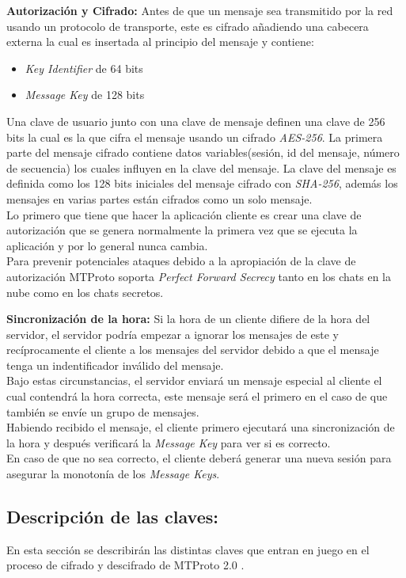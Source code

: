 \begin{description}
	\item \textbf{Autorización y Cifrado:}
			Antes de que un mensaje sea transmitido por la red usando un protocolo de transporte, este es cifrado añadiendo una cabecera externa la cual es insertada al principio del mensaje y contiene:
	\begin{itemize}
		\item \emph{Key Identifier} de 64 bits
		\item \emph{Message Key} de 128 bits
	\end{itemize}
Una clave de usuario junto con una clave de mensaje definen una clave de 256 bits la cual es la que cifra el mensaje usando un cifrado \emph{AES-256}.
La primera parte del mensaje cifrado contiene datos variables(sesión, id del mensaje, número de secuencia) los cuales influyen en la clave del mensaje. La clave del mensaje es definida como los 128 bits iniciales del mensaje cifrado con \emph{SHA-256}, 
además los mensajes en varias partes están cifrados como un solo mensaje.\\
Lo primero que tiene que hacer la aplicación cliente es crear una clave de autorización que se genera normalmente la primera vez que se ejecuta la aplicación y por lo general nunca cambia.\\
Para prevenir potenciales ataques debido a la apropiación de la clave de autorización MTProto soporta \emph{Perfect Forward Secrecy} tanto en los chats en la nube como en los chats secretos.
	\item \textbf{Sincronización de la hora:}
Si la hora de un cliente difiere de la hora del servidor, el servidor podría empezar a ignorar los mensajes de este y recíprocamente el cliente a los mensajes del servidor debido a que el mensaje tenga un indentificador inválido del mensaje.\\
Bajo estas circunstancias, el servidor enviará un mensaje especial al cliente el cual contendrá la hora correcta, este mensaje será el primero en el caso de que también se envíe un grupo de mensajes.\\
Habiendo recibido el mensaje, el cliente primero ejecutará una sincronización de la hora y después verificará la \emph{Message Key} para ver si es correcto.\\
En caso de que no sea correcto, el cliente deberá generar una nueva sesión para asegurar la monotonía de los \emph{Message Keys}.
\end{description}

\subsection{Descripción de las claves:}
En esta sección se describirán las distintas claves que entran en juego en el proceso de cifrado y descifrado de MTProto 2.0 \cite{telegram2}.

